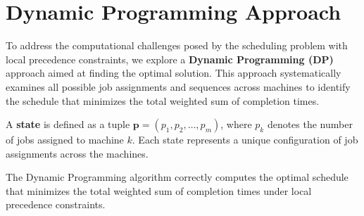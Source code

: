 \section{Dynamic Programming Approach}

To address the computational challenges posed by the scheduling problem with local precedence constraints, we explore a \textbf{Dynamic Programming (DP)} approach aimed at finding the optimal solution. This approach systematically examines all possible job assignments and sequences across machines to identify the schedule that minimizes the total weighted sum of completion times.

\begin{definition}[State]
    \label{def:state}
    A \textbf{state} is defined as a tuple $\boldsymbol{p} = (p_1, p_2, \dots, p_m)$, where $p_k$ denotes the number of jobs assigned to machine $k$. Each state represents a unique configuration of job assignments across the machines.
\end{definition}

\begin{theorem}
    The Dynamic Programming algorithm correctly computes the optimal schedule that minimizes the total weighted sum of completion times under local precedence constraints.
\end{theorem}

